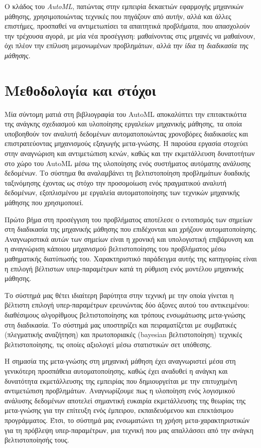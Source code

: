 Ο κλάδος του \textit{AutoML}, πατώντας στην εμπειρία δεκαετιών εφαρμογής μηχανικών μάθησης, χρησιμοποιώντας τεχνικές που πηγάζουν από αυτήν, αλλά και άλλες επιστήμες, προσπαθεί να αντιμετωπίσει τα απαιτητικά προβλήματα, που απασχολούν την τρέχουσα αγορά, με μία νέα προσέγγιση: μαθαίνοντας στις μηχανές να μαθαίνουν, όχι πλέον την επίλυση μεμονωμένων προβλημάτων, αλλά \textit{την ίδια τη διαδικασία της μάθησης}. 


\section{Μεθοδολογία και στόχοι} Μία σύντομη ματιά στη βιβλιογραφία του AutoML αποκαλύπτει την επιτακτικόττα της ανάγκης σχεδιασμού και υλοποίησης εργαλείων μηχανικής μάθησης, τα οποία υποβοηθούν τον αναλυτή δεδομένων αυτοματοποιώντας χρονοβόρες διαδικασίες και επιστρατεύοντας μηχανισμούς εξαγωγής μετα-γνώσης. Η παρούσα εργασία στοχεύει στην αναγνώριση και αντιμετώπιση κενών, καθώς και την εκμετάλλευση δυνατοτήτων στο χώρο του AutoML μέσω της υλοποίησης ενός συστήματος αυτόματης ανάλυσης δεδομένων. Το σύστημα θα αναλαμβάνει τη βελτιστοποίηση προβλημάτων δυαδικής ταξινόμησης έχοντας ως στόχο την προσομοίωση ενός πραγματικού αναλυτή δεδομένων, εξοπλισμένου με εργαλεία αυτοματοποίησης των τεχνικών μηχανικής μάθησης που χρησιμοποιεί.

Πρώτο βήμα στη προσέγγιση του προβλήματος αποτέλεσε ο εντοπισμός των σημείων στη διαδικασία της μηχανικής μάθησης που επιδέχονται και χρήζουν αυτοματοποίησης. Αναγνωριστικά αυτών των σημείων είναι η χρονική και υπολογιστική επιβάρυνση και η αναγνώριση κάποιου μηχανισμού βελτιστοποίησης του προβλήματος μέσω μαθηματικής διατύπωσής του. Χαρακτηριστικό παράδειγμα αυτής της κατηγορίας είναι η επιλογή βέλτιστων υπερ-παραμέτρων κατά τη ρύθμιση ενός μοντέλου μηχανικής μάθησης.

Το σύστημά μας θέτει ιδιαίτερη βαρύτητα στην τεχνική με την οποία γίνεται η βέλτιστη επιλογή υπερ-παραμέτρων ερευνώντας δύο άξονες αυτού του αντικειμένου: διαθέσιμους αλγορίθμους βελτιστοποίησης και τρόπους ενσωμάτωσης μετα-γνώσης στη διαδικασία. Το σύστημά μας υποστηρίζει και πειραματίζεται με συμβατικές (πλεγματικής αναζήτηση) και πρωτοποριακές (bayesian βελτιστοποίηση) τεχνικές βελτιστοποίησης, τις οποίες αξιολογεί μέσω στατιστικών σετ υπόθεσης.

Η σημασία της μετα-γνώσης στη μηχανική μάθηση έχει αναγνωριστεί μέσα στη  γενικότερη προσπάθεια αυτοματοποίησης, καθώς έχει αναδυθεί η ανάγκη και δυνατότητα εκμετάλλευσης της εμπειρίας που δημιουργείται με την επιτυχημένη αντιμετώπιση προβλημάτων. Αναγνωρίζουμε πως η υλοποίηση ενός λογισμικού ανάλυσης δεδομένων αποτελεί σημαντική ευκαιρία εκμετάλλευσης της θεωρίας της μετα-γνώσης για την επίτευξη ενός έμπειρου, εκπαιδευόμενου και επεκτάσιμου προγράμματος. Έτσι, το σύστημά μας ενσωματώνει τη χρήση μετα-χαρακτηριστικών για τη πρόβλεψη υπερ-παραμέτρων, μια τεχνική που μας απαλλάσσει από την ανάγκη βελτιστοποίησής τους. 

